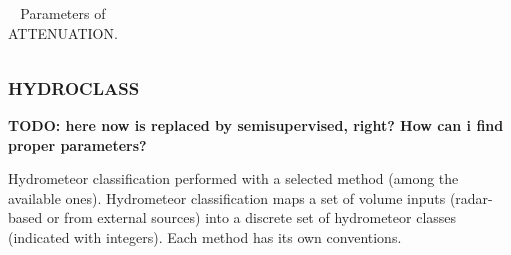 \documentclass[a4paper,11pt,pdftex,twoside]{scrartcl}
\renewcommand{\bf}{\normalfont \bfseries}
\begin{document}
{{{\begin{table}[H]
\begin{tabularx}{\textwidth}{llX}
\end{tabularx}
\caption{Parameters of ATTENUATION.}
\label{tab_dataset_attenuation}
\end{table}

\subsubsection{HYDROCLASS}
\label{subsec_hydroclass}

{\bf TODO: here now is replaced by semisupervised, right? How can i find proper parameters?}


Hydrometeor classification performed with a selected method (among the available ones). Hydrometeor classification maps a set of volume inputs (radar-based or from external sources) into a discrete set of hydrometeor classes (indicated with integers). Each method has its own conventions.

}}}
\end{document}
